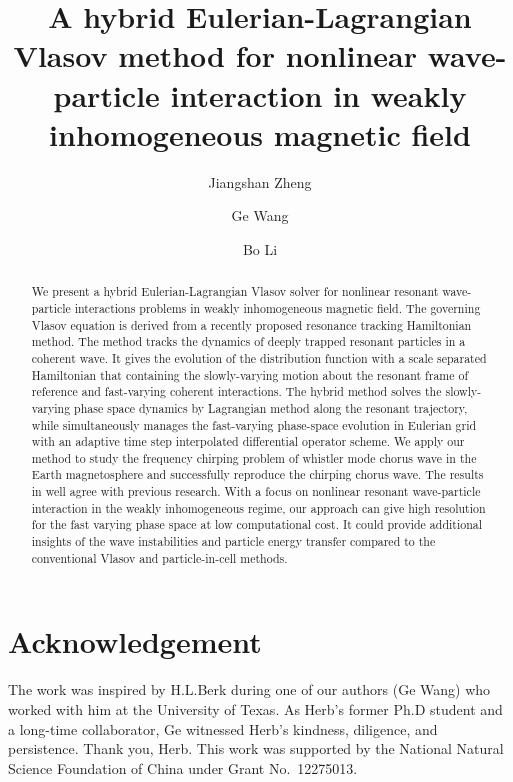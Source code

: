 \documentclass[times,12pt,3p,longtitle]{elsarticle}
\begin{document}
\begin{frontmatter}
\title{A hybrid Eulerian-Lagrangian Vlasov method for nonlinear wave-particle interaction in weakly inhomogeneous magnetic field}
\author[1]{Jiangshan Zheng}
\author[2,3]{Ge Wang}
\author[1]{Bo Li}
\address[1]{School of Physics, Beihang University, Beijing, Beijing 100191, China}
\address[2]{Institute for Fusion Studies, The University of Texas, Austin, Texas, 78712, USA}
\address[3]{Center for Plasma Theory and Computation, Madison, Wisconsin 53706, USA}
\begin{abstract}
  We present a hybrid Eulerian-Lagrangian Vlasov solver for nonlinear resonant wave-particle interactions problems in weakly inhomogeneous magnetic field.
  The governing Vlasov equation is derived from a recently proposed resonance tracking Hamiltonian method. 
  The method tracks the dynamics of deeply trapped resonant particles in a coherent wave. 
  It gives the evolution of the distribution function with a scale separated Hamiltonian that containing the slowly-varying motion about the resonant frame of reference and fast-varying coherent interactions.
  The hybrid method solves the slowly-varying phase space dynamics by Lagrangian method along the resonant trajectory, while simultaneously manages the fast-varying phase-space evolution in Eulerian grid with an adaptive time step interpolated differential operator scheme.
  We apply our method to study the frequency chirping problem of whistler mode chorus wave in the Earth magnetosphere and successfully reproduce the chirping chorus wave. 
  The results in well agree with previous research. 
  With a focus on nonlinear resonant wave-particle interaction in the weakly inhomogeneous regime, our approach can give high resolution for the fast varying phase space at low computational cost.  
  It could provide additional insights of the wave instabilities and particle energy transfer compared to the conventional Vlasov and particle-in-cell methods.
\end{abstract}
\end{frontmatter}

\clearpage











\section*{Acknowledgement}
    The work was inspired by H.L.Berk during one of our authors (Ge Wang) who worked with him at the University of Texas.
    As Herb's former Ph.D student and a long-time collaborator, Ge witnessed Herb's kindness, diligence, and persistence.
    Thank you, Herb.
    This work was supported by the National Natural Science Foundation of China under Grant No.~12275013.



\end{document}
